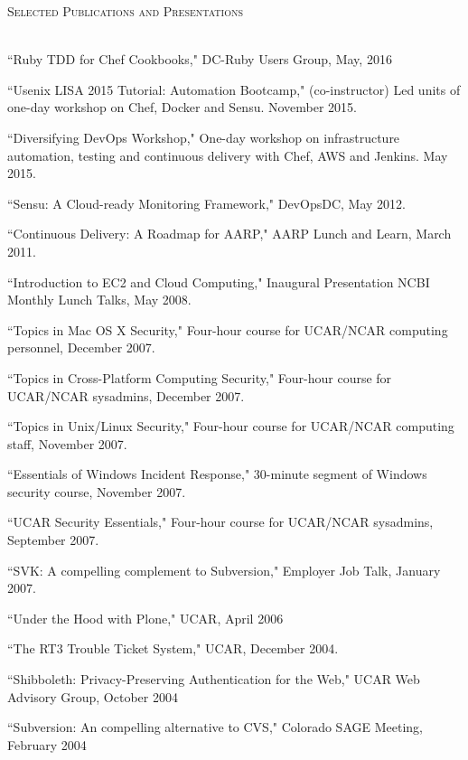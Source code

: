 \documentclass{article}
\newcommand{\lineunder}{\vspace*{-8pt} \\ \hspace*{-18pt} \hrulefill \\}
\newcommand{\header}[1]{{\hspace*{-15pt}\vspace*{6pt} \textsc{#1}} \vspace*{-6pt} \lineunder}
\newenvironment{achievements}{\begin{list}{\topsep 0pt \itemsep -2pt}} {\vspace*{4pt}\end{list}}
\begin{document}
\header{Selected Publications and Presentations}
\begin{achievements}
\item ``Ruby TDD for Chef Cookbooks," DC-Ruby Users Group, May, 2016
\item ``Usenix LISA 2015 Tutorial: Automation Bootcamp," (co-instructor) Led units of one-day workshop on Chef, Docker and Sensu. November 2015.
\item ``Diversifying DevOps Workshop," One-day workshop on infrastructure automation, testing and continuous delivery with Chef, AWS and Jenkins. May 2015.
\item ``Sensu: A Cloud-ready Monitoring Framework," DevOpsDC, May 2012.
\item ``Continuous Delivery: A Roadmap for AARP," AARP Lunch and Learn, March 2011.
\item ``Introduction to EC2 and Cloud Computing," Inaugural Presentation NCBI Monthly Lunch Talks, May 2008.
\item ``Topics in Mac OS X Security," Four-hour course for UCAR/NCAR computing personnel, December 2007.
\item ``Topics in Cross-Platform Computing Security," Four-hour course for UCAR/NCAR sysadmins, December 2007.
\item ``Topics in Unix/Linux Security," Four-hour course for UCAR/NCAR computing staff, November 2007.
\item ``Essentials of Windows Incident Response," 30-minute segment of Windows security course, November 2007.
\item ``UCAR Security Essentials,"  Four-hour course for UCAR/NCAR sysadmins, September 2007.
\item ``SVK: A compelling complement to Subversion," Employer Job Talk, January 2007.
\item ``Under the Hood with Plone," UCAR, April 2006
\item ``The RT3 Trouble Ticket System," UCAR, December 2004.
\item ``Shibboleth: Privacy-Preserving Authentication for the Web," UCAR Web Advisory Group, October 2004
\item ``Subversion: An compelling alternative to CVS," Colorado SAGE Meeting, February 2004

\end{achievements}
\end{document}
